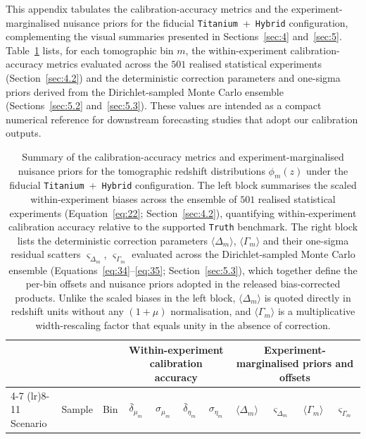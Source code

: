This appendix tabulates the calibration-accuracy metrics and the experiment-marginalised nuisance priors for the fiducial \texttt{Titanium}~+~\texttt{Hybrid} configuration, complementing the visual summaries presented in Sections~\ref{sec:4} and~\ref{sec:5}. Table~\ref{tab:A1} lists, for each tomographic bin \(m\), the within-experiment calibration-accuracy metrics evaluated across the \(501\) realised statistical experiments (Section~\ref{sec:4.2}) and the deterministic correction parameters and one-sigma priors derived from the Dirichlet-sampled Monte Carlo ensemble (Sections~\ref{sec:5.2} and~\ref{sec:5.3}). These values are intended as a compact numerical reference for downstream forecasting studies that adopt our calibration outputs.

\begin{table}
  \centering
  \footnotesize
  \begin{threeparttable}
    \caption{Summary of the calibration-accuracy metrics and experiment-marginalised nuisance priors for the tomographic redshift distributions \(\phi_m(z)\) under the fiducial \texttt{Titanium}~+~\texttt{Hybrid} configuration. The left block summarises the scaled within-experiment biases across the ensemble of \(501\) realised statistical experiments (Equation~\ref{eq:22}; Section~\ref{sec:4.2}), quantifying within-experiment calibration accuracy relative to the supported \texttt{Truth} benchmark. The right block lists the deterministic correction parameters \(\langle\Delta_m\rangle\), \(\langle\Gamma_m\rangle\) and their one-sigma residual scatters \(\varsigma_{\Delta_m}\), \(\varsigma_{\Gamma_m}\) evaluated across the Dirichlet-sampled Monte Carlo ensemble (Equations~\ref{eq:34}--\ref{eq:35}; Section~\ref{sec:5.3}), which together define the per-bin offsets and nuisance priors adopted in the released bias-corrected products. Unlike the scaled biases in the left block, \(\langle\Delta_m\rangle\) is quoted directly in redshift units without any \((1+\mu)\) normalisation, and \(\langle\Gamma_m\rangle\) is a multiplicative width-rescaling factor that equals unity in the absence of correction.}
    \label{tab:A1}
    \begin{tabular}{llccccccccc}
      \toprule
      & & & \multicolumn{4}{c}{Within-experiment calibration accuracy} & \multicolumn{4}{c}{Experiment-marginalised priors and offsets} \\ 
      \cmidrule(lr){4-7} \cmidrule(lr){8-11}
      Scenario & Sample & Bin & \(\bar{\delta}_{\mu_m}\) & \(\sigma_{\mu_m}\) & \(\bar{\delta}_{\eta_m}\) & \(\sigma_{\eta_m}\) & \(\langle \Delta_m \rangle\) & \(\varsigma_{\Delta_m}\) & \(\langle \Gamma_m \rangle\) & \(\varsigma_{\Gamma_m}\) \\

\end{tabular}
\end{threeparttable}
\end{table}
